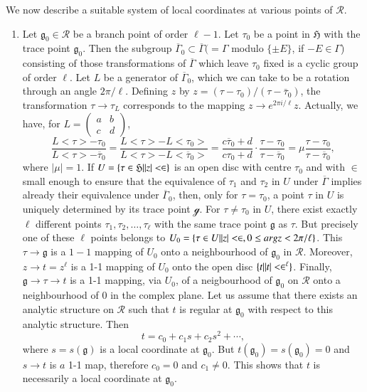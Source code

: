 We now describe a suitable system of local coordinates at various
points of $\mathscr{R}$.
\begin{enumerate}
\item Let $\mathfrak{g}_0 \in \mathscr{R}$ be a branch point
  of order $\ell-1$. Let $\tau_0$ be a point in $\mathfrak{H}$ with
  the trace point $\mathfrak{g}_0$. Then the subgroup
  $\overline{\Gamma}_0 \subset \overline{\Gamma}(=\Gamma$ modulo
  $\{\pm E\}$, if $-E\in \Gamma$) consisting of those
  transformations of $\overline{\Gamma}$ which leave $\tau_0$ fixed is
  a cyclic group of order $\ell$. Let $L$ be a generator of
  $\overline{\Gamma}_0$, which we can take to be a rotation through an
  angle $2\pi/\ell$. Defining $z$ by
  $z=(\tau-\tau_0)/(\tau-\bar{\tau}_0)$, the transformation $\tau \to
  \tau_L$ corresponds to the mapping $z\to e^{2\pi
    i/\ell}z$. Actually, we have, for $L=\left(\begin{smallmatrix}
  a&b\\c&d\end{smallmatrix} \right)$,
$$
\frac{L<\tau>-\tau_0}{L<\tau>-\overline{\tau}_0} = 
\frac{L<\tau>-L<\tau_0>}{L<\tau>-L<\overline{\tau}_0>} = 
\frac{c\overline{\tau}_0 + d}{c\tau_0 + d} \cdot \frac{\tau -
\tau_0}{\tau-\overline{\tau}_0} = \mu
\frac{\tau-\tau_0}{\tau-\overline{\tau}_0},  
$$
where $|\mu|=1$. If $U=\{ \tau \in
\mathfrak{H}\arrowvert|z|<\in\}$ is an open disc with centre
$\tau_0$ and with $\in$ small enough to ensure that the
equivalence of $\tau_{1}$ and $\tau_2$ in $U$ under
$\overline{\Gamma}$ implies already their equivalence under
$\overline{\Gamma}_0$, then, only for $\tau=\tau_0$, a point $\tau$
in $U$ is uniquely determined by its trace point $\mathscr{g}$. For
$\tau \neq \tau_0$ in $U$, there exist exactly $\ell$ different points
$\tau_1, \tau_2, \ldots , \tau_{\ell}$ with the same trace point
$\mathfrak{g}$ as $\tau$. But precisely one of these $\ell$ points
belongs to $U_0 = \{\tau \in U\arrowvert |z|<\in, 0
\leq arg z < 2 \pi/\ell\}$. This $\tau \to \mathfrak{g}$ is a $1-1$
mapping of $U_0$ onto a neighbourhood of $\mathfrak{g}_0$ in
$\mathscr{R}$. Moreover, $z\to t = z^{\ell}$ is a 1-1 mapping of $U_0$
onto the open disc $\{t\arrowvert |t| <
\in^{\ell}\}$. Finally, $\mathfrak{g} \to \tau \to t$ is a 
1-1 mapping, \pageoriginale via $U_0$, of a neigbourhood of
$\mathfrak{g}_0$ on $\mathscr{R}$ onto a neighbourhood of 0 in the
complex plane. Let us assume that there exists an analytic structure
on $\mathscr{R}$ such that $t$ is regular at $\mathfrak{g}_0$ with
respect to this analytic structure. Then 
$$
t = c_0 + c_1 s + c_2 s^2+ \cdots,
$$
where $s=s(\mathfrak{g})$ is a local coordinate at
$\mathfrak{g}_0$. But $t(\mathfrak{g}_0)=s(\mathfrak{g}_0)=0$ and
$s\to t$ is $a$ 1-1 map, therefore $c_0=0$ and $c_1\neq 0$. This
shows that $t$ is necessarily a local coordinate at $\mathfrak{g}_0$.


\end{enumerate}
